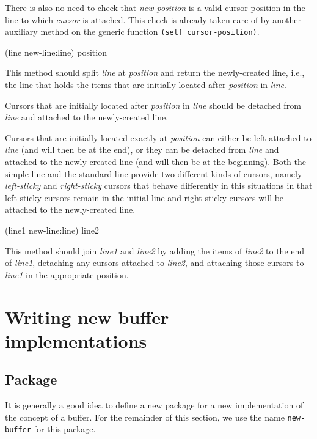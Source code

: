 There is also no need to check that \textit{new-position} is a valid
cursor position in the line to which \textit{cursor} is attached.
This check is already taken care of by another auxiliary method on the
generic function \texttt{(setf cursor-position)}.

 {(line new-line:line) position}

This method should split \textit{line} at \textit{position} and return
the newly-created line, i.e., the line that holds the items that are
initially located after \textit{position} in \textit{line}.

Cursors that are initially located after \textit{position} in
\textit{line} should be detached from \textit{line} and attached to
the newly-created line.

Cursors that are initially located exactly at \textit{position} can
either be left attached to \textit{line} (and will then be at the
end), or they can be detached from \textit{line} and attached to the
newly-created line (and will then be at the beginning).  Both the
simple line  and the standard
line  provide two different
kinds of cursors, namely \emph{left-sticky} and \emph{right-sticky}
cursors that behave differently in this situations in that left-sticky
cursors remain in the initial line and right-sticky cursors will be
attached to the newly-created line.

 {(line1 new-line:line) line2}

This method should join \textit{line1} and \textit{line2} by adding
the items of \textit{line2} to the end of \textit{line1}, detaching
any cursors attached to \textit{line2}, and attaching those cursors to
\textit{line1} in the appropriate position.

\section{Writing new buffer implementations}

\subsection{Package}

It is generally a good idea to define a new package for a new
implementation of the concept of a buffer.  For the remainder of this
section, we use the name \texttt{new-buffer} for this package.

